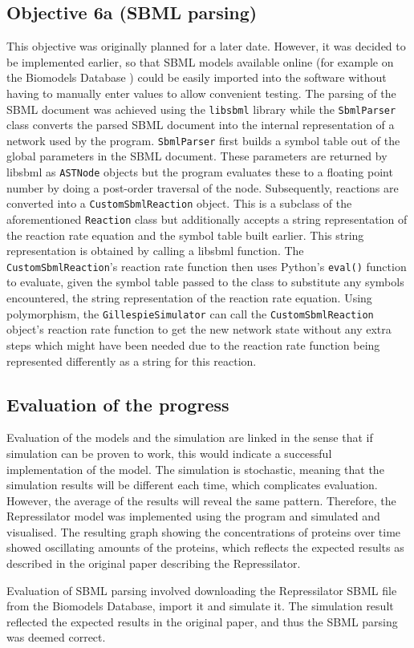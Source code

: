 \documentclass{article}
\begin{document}
	\subsection{Objective 6a (SBML parsing)} 
	This objective was originally planned for a later date. However, it was decided to be implemented earlier, so that SBML models available online (for example on the Biomodels Database \cite{biomodels}) could be easily imported into the software without having to manually enter values to allow convenient testing. The parsing of the SBML document was achieved using the \verb|libsbml| \cite{libsbml} library while the \verb|SbmlParser| class converts the parsed SBML document into the internal representation of a network used by the program. \verb|SbmlParser| first builds a symbol table out of the global parameters in the SBML document. These parameters are returned by libsbml as \verb|ASTNode| objects but the program evaluates these to a floating point number by doing a post-order traversal of the node. Subsequently, reactions are converted into a \verb|CustomSbmlReaction| object. This is a subclass of the aforementioned \verb|Reaction| class but additionally accepts a string representation of the reaction rate equation and the symbol table built earlier. This string representation is obtained by calling a libsbml function. The \verb|CustomSbmlReaction|'s reaction rate function then uses Python's \verb|eval()| function to evaluate, given the symbol table passed to the class to substitute any symbols encountered, the string representation of the reaction rate equation. Using polymorphism, the \verb|GillespieSimulator| can call the \verb|CustomSbmlReaction| object's reaction rate function to get the new network state without any extra steps which might have been needed due to the reaction rate function being represented differently as a string for this reaction.
	
	\subsection{Evaluation of the progress}
	\par Evaluation of the models and the simulation are linked in the sense that if simulation can be proven to work, this would indicate a successful implementation of the model. The simulation is stochastic, meaning that the simulation results will be different each time, which complicates evaluation. However, the average of the results will reveal the same pattern. Therefore, the Repressilator \cite{repressilator} model was implemented using the program and simulated and visualised. The resulting graph showing the concentrations of proteins over time showed oscillating amounts of the proteins, which reflects the expected results as described in the original paper describing the Repressilator.
	\par Evaluation of SBML parsing involved downloading the Repressilator SBML file from the Biomodels Database, import it and simulate it. The simulation result reflected the expected results in the original paper, and thus the SBML parsing was deemed correct.
	
\end{document}
